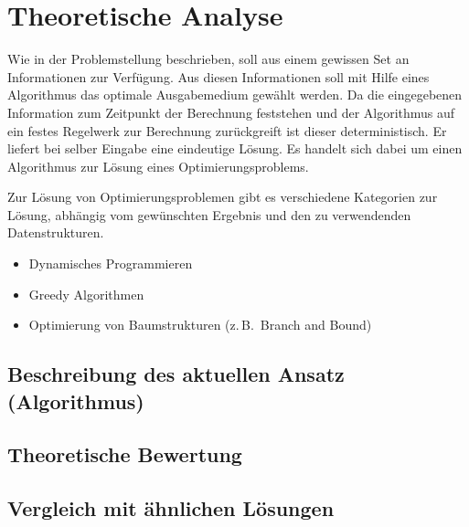 \chapter{Theoretische Analyse}

Wie in der Problemstellung beschrieben, soll aus einem gewissen Set an Informationen zur Verfügung. Aus diesen Informationen soll mit Hilfe eines Algorithmus das optimale Ausgabemedium gewählt werden. Da die eingegebenen Information zum Zeitpunkt der Berechnung feststehen und der Algorithmus auf ein festes Regelwerk zur Berechnung zurückgreift ist dieser deterministisch. Er liefert bei selber Eingabe eine eindeutige Lösung.
Es handelt sich dabei um einen Algorithmus zur Lösung eines Optimierungsproblems.

Zur Lösung von Optimierungsproblemen gibt es verschiedene Kategorien zur Lösung, abhängig vom gewünschten Ergebnis und den zu verwendenden Datenstrukturen. 
\begin{itemize}
	\item Dynamisches Programmieren
	\item Greedy Algorithmen
	\item Optimierung von Baumstrukturen (z.\,B.\ Branch and Bound)
\end{itemize}

\section{Beschreibung des aktuellen Ansatz (Algorithmus)}

\section{Theoretische Bewertung}

\section{Vergleich mit ähnlichen Lösungen}